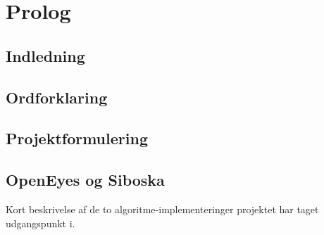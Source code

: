 \documentclass[rapport.tex]{subfiles}
\begin{document}
\section{Prolog}
	\subsection{Indledning}
	\subsection{Ordforklaring}
	\subsection{Projektformulering}
	\subsection{OpenEyes og Siboska}
	Kort beskrivelse af de to algoritme-implementeringer projektet har taget udgangspunkt i.	
	
		
\end{document}
